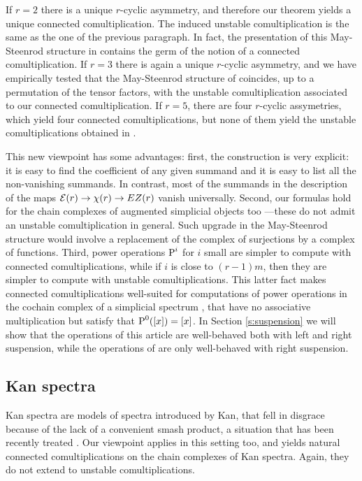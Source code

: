 If $r=2$ there is a unique $r$-cyclic asymmetry, and therefore our theorem yields a unique connected comultiplication. The induced unstable comultiplication is the same as the one of the previous paragraph. In fact, the presentation of this May-Steenrod structure in \cite{medina2021fast_sq} contains the germ of the notion of a connected comultiplication. If $r=3$ there is again a unique $r$-cyclic asymmetry, and we have empirically tested that the May-Steenrod structure of \cite{medina2021may_st} coincides, up to a permutation of the tensor factors, with the unstable comultiplication associated to our connected comultiplication. If $r= 5$, there are four $r$-cyclic assymetries, which yield four connected comultiplications, but none of them yield the unstable comultiplications obtained in \cite{medina2021may_st}.

This new viewpoint has some advantages: first, the construction is very explicit: it is easy to find the coefficient of any given summand and it is easy to list all the non-vanishing summands. In contrast, most of the summands in the description of the maps $\mathcal{E}(r)\to \chi(r)\to EZ(r)$ vanish universally. Second, our formulas hold for the chain complexes of augmented simplicial objects too ---these do not admit an unstable comultiplication in general. Such upgrade in the May-Steenrod structure would involve a replacement of the complex of surjections by a complex of functions. Third, power operations $\operatorname{P}^i$ for $i$ small are simpler to compute with connected comultiplications, while if $i$ is close to $(r-1)m$, then they are simpler to compute with unstable comultiplications. This latter fact makes connected comultiplications well-suited for computations of power operations in the cochain complex of a simplicial spectrum \cite{Gill2020}, that have no associative multiplication but satisfy that $\operatorname{P}^0([x])=[x]$. In Section \ref{s:suspension} we will show that the operations of this article are well-behaved both with left and right suspension, while the operations of \cite{medina2021may_st} are only well-behaved with right suspension.

\subsection*{Kan spectra} Kan spectra \cite{Kan1963} are models of spectra introduced by Kan, that fell in disgrace because of the lack of a convenient smash product, a situation that has been recently treated \cite{CKP2023}. Our viewpoint applies in this setting too, and yields natural connected comultiplications on the chain complexes of Kan spectra. Again, they do not extend to unstable comultiplications.



